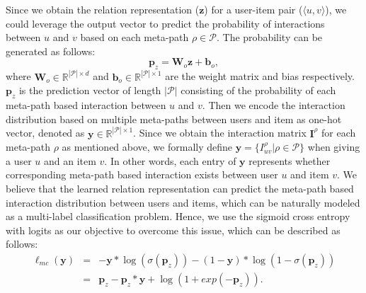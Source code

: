 Since we obtain the relation representation (\ie $\bm{z}$) for a user-item pair (\ie $\langle u, v \rangle$), we could leverage the output vector to predict the probability of interactions between $u$ and $v$ based on each meta-path $\rho \in \mathcal{P}$. The probability can be generated as follows:
\begin{equation}
\bm{p}_z = \bm{W}_o\bm{z} + \bm{b}_o,
\end{equation}
where $\bm{W}_o \in \mathbb{R}^{|\mathcal{P}| \times d}$ and $\bm{b}_o \in \mathbb{R}^{|\mathcal{P}| \times 1}$ are the weight matrix and bias respectively. $\bm{p}_z$ is the prediction vector of length $|\mathcal{P}|$ consisting of the probability of each meta-path based interaction between $u$ and $v$. Then we encode the interaction distribution based on multiple meta-paths between users and item as one-hot vector, denoted as $\bm{y} \in \mathbb{R}^{|\mathcal{P}| \times 1}$. Since we obtain the interaction matrix $\bm{I}^{\rho}$ for each meta-path $\rho$ as mentioned above, we formally define $\bm{y} = \{I^{\rho}_{uv} | \rho \in \mathcal{P}\}$ when giving a user $u$ and an item $v$. In other words, each entry of $\bm{y}$ represents whether corresponding meta-path based interaction exists between user $u$ and item $v$. We believe that the learned relation representation can predict the meta-path based interaction distribution between users and items, which can be naturally modeled as a multi-label classification problem. Hence, we use the sigmoid cross entropy with logits as our objective to overcome this issue, which can be described as follows:
\begin{eqnarray}
\label{eq-relation}
\ell_{mc}(\bm{y}) &=& -\bm{y} * \log(\sigma(\bm{p}_z)) - (1 - \bm{y}) * \log(1 - \sigma(\bm{p}_z)) \nonumber \\
&=& \bm{p}_z - \bm{p}_z * \bm{y} + \log(1 + exp(-\bm{p}_z)).
\end{eqnarray}
